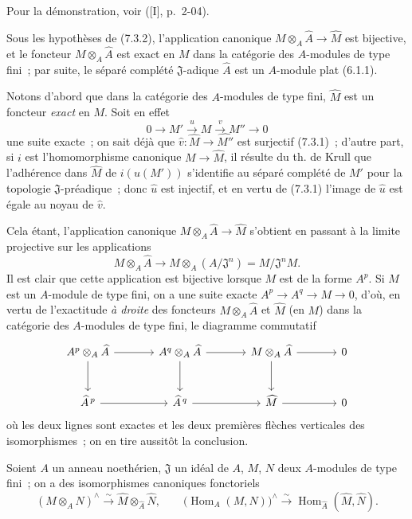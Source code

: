 Pour la démonstration, voir ([I], p.~2-04).


\begin{corollary}[7.3.3]
\label{0.7.3.3-fr}
Sous les hypothèses de (7.3.2), l'application canonique
$M\otimes_A\widehat A\to\widehat M$ est bijective, et le foncteur
$M\otimes_A\widehat A$ est exact en $M$ dans la catégorie des $A$-modules de
type fini~; par suite, le séparé complété $\mathfrak J$-adique $\widehat A$
est un $A$-module plat (6.1.1).
\end{corollary}

Notons d'abord que dans la catégorie des $A$-modules de type fini,
$\widehat M$ est un foncteur \emph{exact} en $M$. Soit en effet
\[
  0\to M'\xrightarrow{u}M\xrightarrow{v}M''\to0
\]
une suite exacte~; on sait déjà que
$\widehat v:\widehat M\to\widehat{M''}$ est surjectif (7.3.1)~; d'autre part,
si $i$ est l'homomorphisme canonique $M\to\widehat M$, il résulte du th. de
Krull que l'adhérence dans $\widehat M$ de $i(u(M'))$ s'identifie au séparé
complété de $M'$ pour la topologie $\mathfrak J$-préadique~; donc
$\widehat u$ est injectif, et en vertu de (7.3.1) l'image de $\widehat u$ est
égale au noyau de $\widehat v$.

Cela étant, l'application canonique $M\otimes_A\widehat A\to\widehat M$
s'obtient en passant à la limite projective sur les applications
\[
  M\otimes_A\widehat A\to
  M\otimes_A(A/\mathfrak J^n)=M/\mathfrak J^nM.
\]
Il est clair que cette application est bijective lorsque $M$ est de la forme
$A^p$. Si $M$ est un $A$-module de type fini, on a une suite exacte
$A^p\to A^q\to M\to0$, d'où, en vertu de l'exactitude \emph{à droite} des
foncteurs $M\otimes_A\widehat A$ et $\widehat M$ (en $M$) dans la catégorie
des $A$-modules de type fini, le diagramme commutatif
\[
\begin{tikzcd}[column sep=large,row sep=large]
  A^p\otimes_A\widehat A \arrow[r] \arrow[d] &
  A^q\otimes_A\widehat A \arrow[r] \arrow[d] &
  M\otimes_A\widehat A \arrow[r] \arrow[d] &
  0 \\
  \widehat A^{\,p} \arrow[r] &
  \widehat A^{\,q} \arrow[r] &
  \widehat M \arrow[r] &
  0
\end{tikzcd}
\]
où les deux lignes sont exactes et les deux premières flèches verticales des
isomorphismes~; on en tire aussitôt la conclusion.

\begin{corollary}[7.3.4]
\label{0.7.3.4-fr}
Soient $A$ un anneau noethérien, $\mathfrak J$ un idéal de $A$, $M$, $N$ deux
$A$-modules de type fini~; on a des isomorphismes canoniques fonctoriels
\[
  (M\otimes_A N)^\wedge
  \xrightarrow{\sim}
  \widehat M\otimes_{\widehat A}\widehat N,
  \qquad
  \bigl(\operatorname{Hom}_A(M,N)\bigr)^\wedge
  \xrightarrow{\sim}
  \operatorname{Hom}_{\widehat A}(\widehat M,\widehat N).
\]
\end{corollary}


